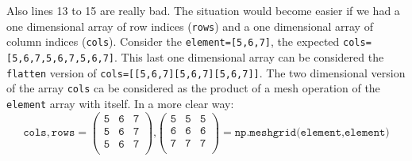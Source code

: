 \documentclass[11pt]{amsart}
\begin{document}
Also lines 13 to 15 are really bad. The situation would become easier if we had
a one dimensional array  of row indices (\texttt{rows}) and a one dimensional array of 
column indices (\texttt{cols}).
Consider the \texttt{element=[5,6,7]}, the expected \texttt{cols=[5,6,7,5,6,7,5,6,7]}. 
This last one dimensional array can be considered the \texttt{flatten} version of 
\texttt{cols=[[5,6,7][5,6,7][5,6,7]]}. The two dimensional version of the array 
\texttt{cols} ca be considered as the product of a mesh operation of the 
\texttt{element} array with itself. In a more clear way:
\[
\mathtt{cols,rows}=
\left(
\begin{array}{ccc}
\texttt{5} & \texttt{6} & \texttt{7} \\
\texttt{5} & \texttt{6} & \texttt{7} \\
\texttt{5} & \texttt{6} & \texttt{7} \\
\end{array}
\right)\texttt{,}
\left(
\begin{array}{ccc}
\texttt{5} & \texttt{5} & \texttt{5} \\
\texttt{6} & \texttt{6} & \texttt{6} \\
\texttt{7} & \texttt{7} & \texttt{7} \\
\end{array}
\right) = 
\texttt{np.meshgrid(element,element)}
\]
\end{document}
